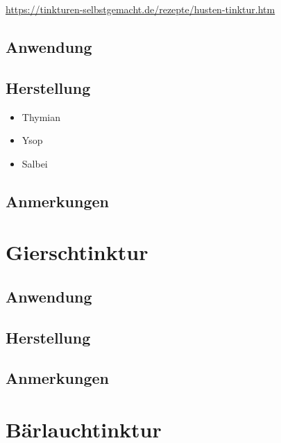 \cite{tinkturen}  

\url{https://tinkturen-selbstgemacht.de/rezepte/husten-tinktur.htm} 

 

\subsection{Anwendung}
\subsection{Herstellung}
\begin{itemize}
	\item Thymian
	\item Ysop
	\item Salbei
\end{itemize}

\subsection{Anmerkungen}



\newpage



\section{Gierschtinktur}


    

\subsection{Anwendung}
\subsection{Herstellung}
\subsection{Anmerkungen}



\newpage



\section{Bärlauchtinktur}

